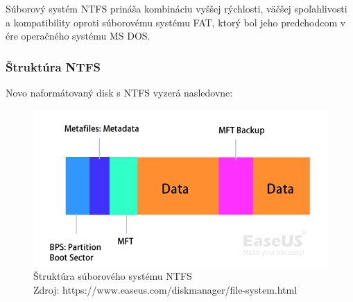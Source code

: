 \documentclass[12pt,oneside,slovak,a4paper]{article}
\begin{document}
Súborový systém NTFS prináša kombináciu vyššej rýchlosti, väčšej spoľahlivosti a kompatibility oproti súborovému systému FAT, ktorý bol jeho predchodcom v ére operačného systému MS DOS.

\subsubsection{Štruktúra NTFS}
Novo naformátovaný disk s NTFS vyzerá nasledovne:

\begin{figure}[H]
	\centering
	\captionsetup{justification=centering,margin=2cm}
	\includegraphics[width=\linewidth]{./images/ntfs-file-system-structure.png}
	\centering
	\caption{Štruktúra súborového systému NTFS \\ Zdroj: https://www.easeus.com/diskmanager/file-system.html}
\end{figure}
\end{document}
